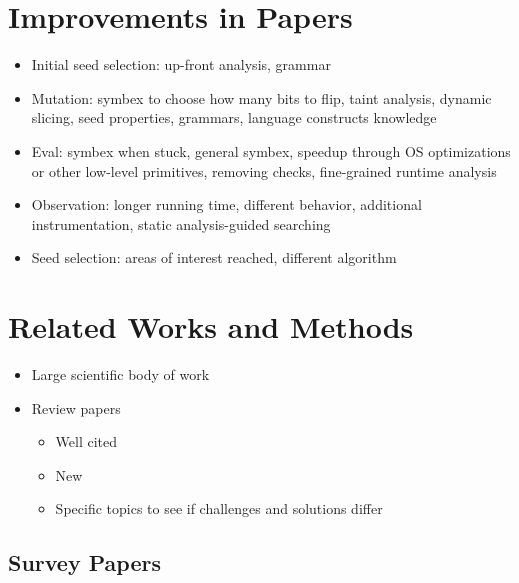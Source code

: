 \documentclass{article}
\begin{document}
\section{Improvements in Papers}
\begin{itemize}
    \item Initial seed selection: up-front analysis\cite{Skyfire, Orthrus, DIFUZE}, grammar\cite{QuickFuzz, QuickFuzz2}
    \item Mutation: symbex to choose how many bits to flip\cite{SYMFUZZ}, taint analysis\cite{Mayhem, Angora, Steelix, VUzzer}, dynamic slicing\cite{MutaGen}, seed properties\cite{SDF}, grammars\cite{SCADA, IMF}, language constructs knowledge\cite{Chizpurfle}
    \item Eval: symbex when stuck\cite{Driller, Mayhem}, general symbex\cite{S2F}, speedup through OS optimizations\cite{OS} or other low-level primitives\cite{IMF, VDF, kAFL}, removing checks\cite{TFuzz}, fine-grained runtime analysis\cite{MEDS}
    \item Observation: longer running time\cite{SlowFuzz}, different behavior\cite{NEZHA}, additional instrumentation\cite{Steelix, Angora}, static analysis-guided searching\cite{Dowser, VUzzer}
    \item Seed selection: areas of interest reached\cite{AFLGo, CGF, FairFuzz, VUzzer}, different algorithm\cite{SeedSelection, Scheduling}
\end{itemize}

\section{Related Works and Methods}
\begin{itemize}
    \item Large scientific body of work
    \item Review papers
          \begin{itemize}
              \item Well cited
              \item New
              \item Specific topics to see if challenges and solutions differ
          \end{itemize}
\end{itemize}

\subsection{Survey Papers}
\end{document}
